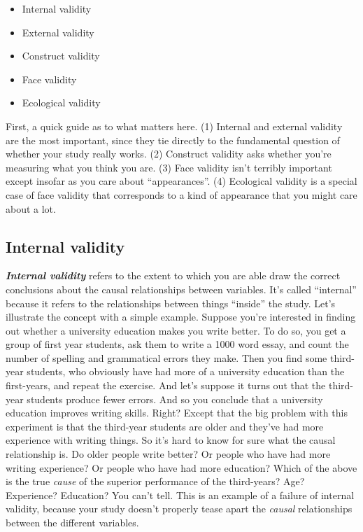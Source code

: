 \documentclass[
]{book}
\providecommand{\tightlist}{%
  \setlength{\itemsep}{0pt}\setlength{\parskip}{0pt}}
\begin{document}
\begin{itemize}
\tightlist
\item
  Internal validity
\item
  External validity
\item
  Construct validity
\item
  Face validity
\item
  Ecological validity
\end{itemize}

First, a quick guide as to what matters here. (1) Internal and external validity are the most important, since they tie directly to the fundamental question of whether your study really works. (2) Construct validity asks whether you're measuring what you think you are. (3) Face validity isn't terribly important except insofar as you care about ``appearances''. (4) Ecological validity is a special case of face validity that corresponds to a kind of appearance that you might care about a lot.

\hypertarget{internal-validity}{%
\subsection{Internal validity}\label{internal-validity}}

\textbf{\emph{Internal validity}} refers to the extent to which you are able draw the correct conclusions about the causal relationships between variables. It's called ``internal'' because it refers to the relationships between things ``inside'' the study. Let's illustrate the concept with a simple example. Suppose you're interested in finding out whether a university education makes you write better. To do so, you get a group of first year students, ask them to write a 1000 word essay, and count the number of spelling and grammatical errors they make. Then you find some third-year students, who obviously have had more of a university education than the first-years, and repeat the exercise. And let's suppose it turns out that the third-year students produce fewer errors. And so you conclude that a university education improves writing skills. Right? Except that the big problem with this experiment is that the third-year students are older and they've had more experience with writing things. So it's hard to know for sure what the causal relationship is. Do older people write better? Or people who have had more writing experience? Or people who have had more education? Which of the above is the true \emph{cause} of the superior performance of the third-years? Age? Experience? Education? You can't tell. This is an example of a failure of internal validity, because your study doesn't properly tease apart the \emph{causal} relationships between the different variables.
\end{document}
